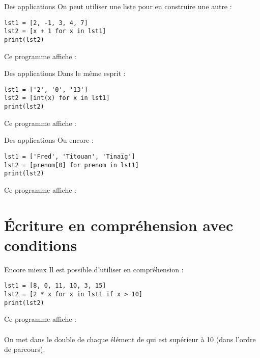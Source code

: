 \documentclass[10pt]{beamer}
\begin{document}
    \begin{frame}[fragile]{Des applications}
        \pause
        On peut utiliser une liste pour en construire une autre :\pause
        \begin{verbatim}
lst1 = [2, -1, 3, 4, 7]
lst2 = [x + 1 for x in lst1]
print(lst2)
        \end{verbatim}
        \pause
        Ce programme affiche : \\\pause

        \pythoninline{[3, 0, 4, 5, 8]}
    \end{frame}

    \begin{frame}[fragile]{Des applications}
        \pause
        Dans le même esprit :\pause
        \begin{verbatim}
lst1 = ['2', '0', '13']
lst2 = [int(x) for x in lst1]
print(lst2)
        \end{verbatim}
        \pause
        Ce programme affiche : \\\pause

        \pythoninline{[2, 0, 13]}
    \end{frame}

    \begin{frame}[fragile]{Des applications}
        \pause
        Ou encore :\pause
        \begin{verbatim}
lst1 = ['Fred', 'Titouan', 'Tinaïg']
lst2 = [prenom[0] for prenom in lst1]
print(lst2)
        \end{verbatim}
        \pause
        Ce programme affiche : \\\pause

        \pythoninline{['F', 'T', 'T']}
    \end{frame}


    \section{\'Ecriture en compréhension avec conditions}

    \begin{frame}[fragile]{Encore mieux}
        \pause
        Il est possible d'utiliser  en compréhension :\pause
        \begin{verbatim}
lst1 = [8, 0, 11, 10, 3, 15]
lst2 = [2 * x for x in lst1 if x > 10]
print(lst2)
        \end{verbatim}
        \pause

        Ce programme affiche :\\\pause
        \pythoninline{[22, 30]}\\\pause
        On met dans  le double de chaque élément de  qui est supérieur à 10 (dans l'ordre de parcours).
    \end{frame}
\end{document}

